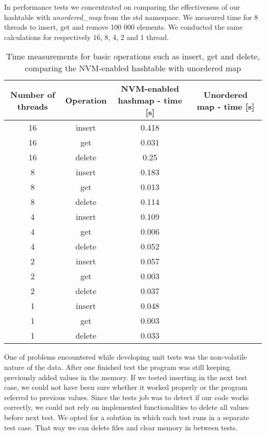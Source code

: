     In performance tests we concentrated on comparing the effectiveness of our hashtable with \textit{unordered\_map} from the std namespace. We measured time for 8 threads to insert, get and remove 100 000 elements. We conducted the same calculations for respectively 16, 8, 4, 2 and 1 thread. 

    \begin{table}[h]
    \caption{Time measurements for basic operations such as insert, get and delete, comparing the NVM-enabled hashtable with unordered map}\label{tab:tabela}
    \centering\footnotesize%
        \begin{tabular}{|c|c|c|c|} 
            \toprule
            Number of threads & Operation & NVM-enabled hashmap - time [s] & Unordered map - time [s] \\
            \midrule
            16 & insert & 0.418 & \\
            16 & get & 0.031 &    \\
            16 & delete & 0.25 &  \\
            \midrule
            8 & insert & 0.183 &  \\
            8 & get & 0.013 &     \\
            8 & delete & 0.114 &  \\
            \midrule
            4 & insert & 0.109 &  \\
            4 & get & 0.006 &     \\
            4 & delete & 0.052 &  \\
            \midrule
            2 & insert & 0.057 &  \\
            2 & get & 0.003 &     \\
            2 & delete & 0.037 &  \\
            \midrule
            1 & insert & 0.048 &  \\
            1 & get & 0.003 &     \\
            1 & delete & 0.033 &  \\
            \bottomrule
        \end{tabular}
    \end{table}

    One of problems encountered while developing unit tests was the non-volatile nature of the data. After one finished test the program was still keeping previously added values in the memory. If we tested inserting in the next test case, we could not have been sure whether it worked properly or the program referred to previous values. Since the tests job was to detect if our code works correctly, we could not rely on implemented functionalities to delete all values before next test. We opted for a solution in which each test runs in a separate test case. That way we can delete files and clear memory in between tests.

